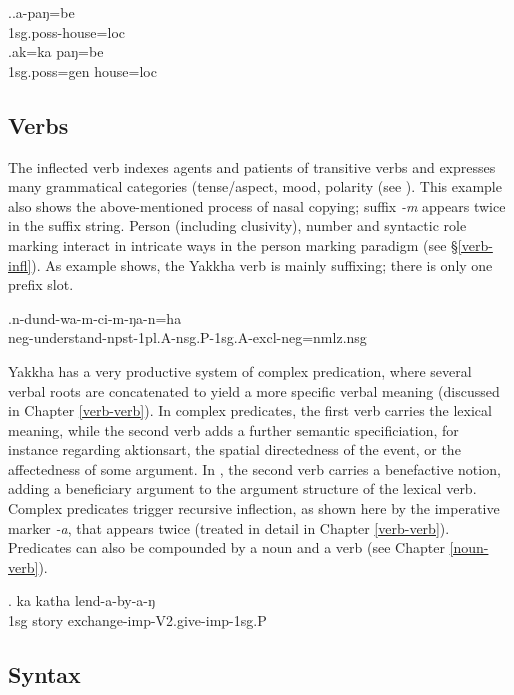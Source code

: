 \ex.\ag.a-paŋ=be\\
{\sc 1sg.poss-}house{\sc =loc}\\
\bg.ak=ka paŋ=be\\
{\sc 1sg.poss=gen} house{\sc =loc}\\


\subsection{Verbs}

The inflected verb  indexes agents and patients of transitive verbs and expresses many grammatical categories (tense/aspect, mood, polarity (see \Next). This example also shows the above-mentioned process of nasal copying; suffix \emph{-m} appears twice in the suffix string. Person (including clusivity), number and syntactic role marking interact in intricate ways in the person marking paradigm (see §\ref{verb-infl}). As example \Next shows, the Yakkha verb is mainly suffixing; there is only one prefix slot. 

\exg.n-dund-wa-m-ci-m-ŋa-n=ha\\
{\sc neg-}understand{\sc -npst-1pl.A-nsg.P-1sg.A-excl-neg=nmlz.nsg}\\


Yakkha has a very productive system of complex predication, where several verbal roots are concatenated to yield a more specific verbal meaning (discussed in Chapter \ref{verb-verb}). In complex predicates, the first verb carries the lexical meaning, while the second verb adds a further semantic specificiation, for instance regarding aktionsart, the spatial directedness of the event, or the affectedness of some argument. In \Next, the second verb carries a benefactive notion, adding a beneficiary argument to the argument structure of the lexical verb. Complex predicates trigger recursive inflection, as shown here by the imperative marker \emph{-a}, that appears twice (treated in detail in Chapter \ref{verb-verb}). Predicates can also be compounded by a noun and a verb  (see Chapter \ref{noun-verb}).
 	
	\exg. ka katha lend-a-by-a-ŋ\\
	{\sc 1sg} story  exchange{\sc -imp-V2.give-imp-1sg.P}\\



\subsection{Syntax}

